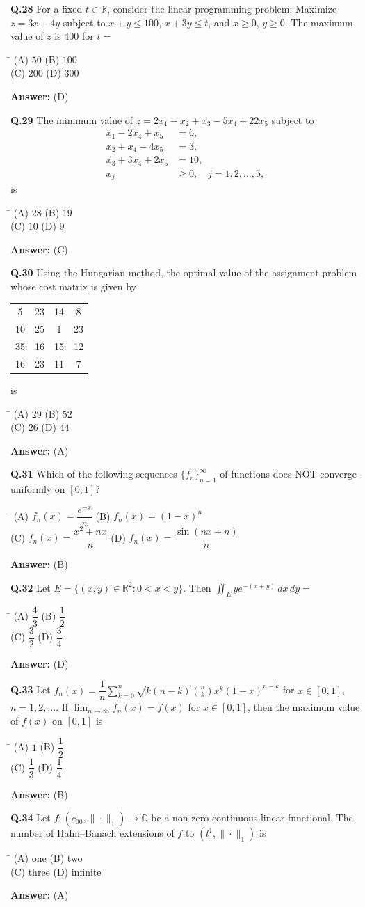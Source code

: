 \documentclass[11pt,a4paper]{article}
\newcommand{\optsfourA}[4]{%
  \begin{tabbing}
    \hspace{0.48\linewidth}\=\kill
    (A) #1 \> (B) #2 \\[2pt]
    (C) #3 \> (D) #4
  \end{tabbing}%
}
\newcommand{\ans}[1]{\textbf{Answer:} #1\par\medskip}
\begin{document}
\textbf{Q.28} For a fixed $t \in \mathbb{R}$, consider the linear programming problem: Maximize $z = 3x + 4y$ subject to $x + y \le 100$, $x + 3y \le t$, and $x \ge 0$, $y \ge 0$. The maximum value of $z$ is $400$ for $t =$
\optsfourA{$50$}{$100$}{$200$}{$300$}
\ans{(D)}

\textbf{Q.29} The minimum value of $z = 2x_1 - x_2 + x_3 - 5x_4 + 22x_5$ subject to
\begin{align*}
  x_1 - 2x_4 + x_5 &= 6, \\
  x_2 + x_4 - 4x_5 &= 3, \\
  x_3 + 3x_4 + 2x_5 &= 10, \\
  x_j &\ge 0, \quad j = 1, 2, \dots, 5,
\end{align*}
is
\optsfourA{$28$}{$19$}{$10$}{$9$}
\ans{(C)}

\textbf{Q.30} Using the Hungarian method, the optimal value of the assignment problem whose cost matrix is given by
\begin{center}
\begin{tabular}{cccc}
  \toprule
  5 & 23 & 14 & 8 \\
  10 & 25 & 1 & 23 \\
  35 & 16 & 15 & 12 \\
  16 & 23 & 11 & 7 \\
  \bottomrule
\end{tabular}
\end{center}
is
\optsfourA{$29$}{$52$}{$26$}{$44$}
\ans{(A)}

\textbf{Q.31} Which of the following sequences $\{f_n\}_{n=1}^{\infty}$ of functions does NOT converge uniformly on $[0, 1]$?
\optsfourA{$f_n(x) = \dfrac{e^{-x}}{n}$}{$f_n(x) = (1 - x)^n$}{$f_n(x) = \dfrac{x^2 + nx}{n}$}{$f_n(x) = \dfrac{\sin(nx + n)}{n}$}
\ans{(B)}

\textbf{Q.32} Let $E = \{(x, y) \in \mathbb{R}^2 : 0 < x < y\}$. Then $\displaystyle\iint_E y e^{-(x + y)}\,dx\,dy =$
\optsfourA{$\dfrac{4}{3}$}{$\dfrac{1}{2}$}{$\dfrac{3}{2}$}{$\dfrac{3}{4}$}
\ans{(D)}

\textbf{Q.33} Let $f_n(x) = \dfrac{1}{n}\displaystyle\sum_{k=0}^{n} \sqrt{k(n - k)}\binom{n}{k} x^k (1 - x)^{n-k}$ for $x \in [0, 1]$, $n = 1, 2, \dots$. If $\displaystyle\lim_{n\to\infty} f_n(x) = f(x)$ for $x \in [0, 1]$, then the maximum value of $f(x)$ on $[0, 1]$ is
\optsfourA{$1$}{$\dfrac{1}{2}$}{$\dfrac{1}{3}$}{$\dfrac{1}{4}$}
\ans{(B)}

\textbf{Q.34} Let $f : (c_{00}, \|\cdot\|_1) \to \mathbb{C}$ be a non-zero continuous linear functional. The number of Hahn--Banach extensions of $f$ to $(l^1, \|\cdot\|_1)$ is
\optsfourA{one}{two}{three}{infinite}
\ans{(A)}
\end{document}
